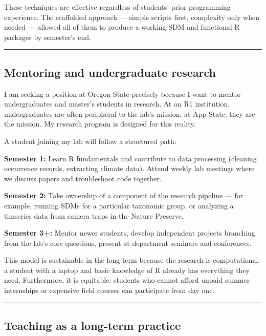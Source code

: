 \documentclass[11pt,letterpaper]{article}
\begin{document}
These techniques are effective regardless of students' prior programming
experience. The scaffolded approach --- simple scripts first, complexity only when needed --- allowed all of them to produce a working SDM and functional R packages by semester's end.

\begin{center}\rule{0.5\linewidth}{0.5pt}\end{center}

\subsection*{Mentoring and undergraduate
research}\label{mentoring-and-undergraduate-research}

I am seeking a position at Oregon State precisely because I want to
mentor undergraduates and master's students in research. At an R1
institution, undergraduates are often peripheral to the lab's mission;
at App State, they are the mission. My research program is designed for
this reality.

A student joining my lab will follow a structured path:

\textbf{Semester 1:} Learn R fundamentals and contribute to data
processing (cleaning occurrence records, extracting climate data).
Attend weekly lab meetings where we discuss papers and troubleshoot code
together.

\textbf{Semester 2:} Take ownership of a component of the research
pipeline --- for example, running SDMs for a particular taxonomic group,
or analyzing a timseries data from camera traps in the Nature Preserve.

\textbf{Semester 3+:} Mentor newer students, develop independent
projects branching from the lab's core questions, present at department
seminars and conferences.

This model is sustainable in the long term because the research is computational: a student with a laptop and basic knowledge of R already has everything they need. Furthermore, it is equitable: students who cannot afford unpaid summer internships or expensive field courses can participate from day one.
\begin{center}\rule{0.5\linewidth}{0.5pt}\end{center}

\subsection*{Teaching as a long-term
practice}\label{teaching-as-a-long-term-practice}
\end{document}
